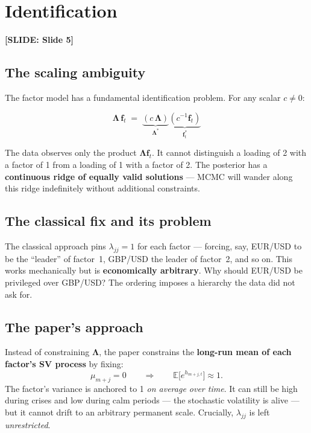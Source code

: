 \documentclass[11pt, a4paper]{article}\usepackage[]{graphicx}\usepackage[]{xcolor}
\newcommand{\slidetag}[1]{%
  \noindent\textcolor{MainBlue}{\footnotesize\textbf{[SLIDE: #1]}}%
  \vspace{0.2em}\par
}
\newcommand{\stress}[1]{\textbf{#1}}
\begin{document}
\section{Identification}

\slidetag{Slide 5}

\subsection{The scaling ambiguity}

The factor model has a fundamental identification problem.  For any scalar
$c \neq 0$:

\begin{formulabox}
\[
  \boldsymbol{\Lambda}\, \mathbf{f}_t
  \;=\;
  \underbrace{(c\,\boldsymbol{\Lambda})}_{\boldsymbol{\Lambda}^*}
  \underbrace{(c^{-1}\mathbf{f}_t)}_{\mathbf{f}_t^*}
\]
\end{formulabox}

The data observes only the product $\boldsymbol{\Lambda}\mathbf{f}_t$.  It
cannot distinguish a loading of 2 with a factor of 1 from a loading of 1 with
a factor of 2.  The posterior has a \stress{continuous ridge of equally valid
solutions} --- MCMC will wander along this ridge indefinitely without
additional constraints.

\subsection{The classical fix and its problem}

The classical approach pins $\lambda_{jj} = 1$ for each factor --- forcing,
say, EUR/USD to be the ``leader'' of factor~1, GBP/USD the leader of
factor~2, and so on.  This works mechanically but is \stress{economically
arbitrary}.  Why should EUR/USD be privileged over GBP/USD?  The ordering
imposes a hierarchy the data did not ask for.

\subsection{The paper's approach}

Instead of constraining $\boldsymbol{\Lambda}$, the paper constrains the
\stress{long-run mean of each factor's SV process} by fixing:
\[
  \mu_{m+j} = 0
  \qquad \Longrightarrow \qquad
  \mathbb{E}\bigl[e^{h_{m+j,t}}\bigr] \approx 1.
\]
The factor's variance is anchored to 1 \textit{on average over time}.  It
can still be high during crises and low during calm periods --- the stochastic
volatility is alive --- but it cannot drift to an arbitrary permanent scale.
Crucially, $\lambda_{jj}$ is left \textit{unrestricted}.
\end{document}
